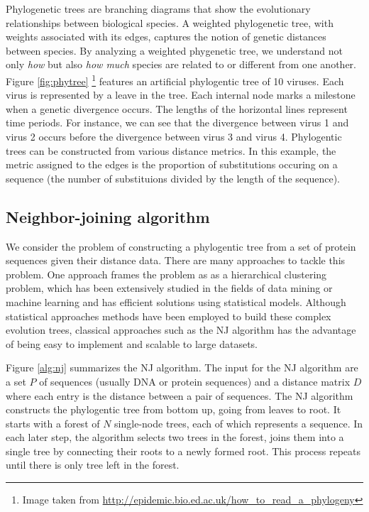 \documentclass[11pt,letterpaper]{article}
\theoremstyle{definition}
\begin{document}
Phylogenetic trees are branching diagrams that show the evolutionary relationships between biological species. A weighted phylogenetic tree, with weights associated with its edges, captures the notion of genetic distances between species. By analyzing a weighted phygenetic tree, we understand not only \textit{how} but also \textit{how much} species are related to or different from one another. Figure \ref{fig:phytree} \footnote{Image taken from \url{http://epidemic.bio.ed.ac.uk/how_to_read_a_phylogeny}} features an artificial phylogentic tree of 10 viruses. Each virus is represented by a leave in the tree. Each internal node marks a milestone when a genetic divergence occurs. The lengths of the horizontal lines represent time periods. For instance, we can see that the divergence between virus 1 and virus 2 occurs before the divergence between virus 3 and virus 4. Phylogentic trees can be constructed from various distance metrics. In this example, the metric assigned to the edges is the proportion of substitutions occuring on a sequence (the number of substituions divided by the length of the sequence). 

\subsection{Neighbor-joining algorithm}

We consider the problem of constructing a phylogentic tree from a set of protein sequences given their distance data. There are many approaches to tackle this problem. One approach frames the problem as as a hierarchical clustering problem, which has been extensively studied in the fields of data mining or machine learning and has efficient solutions using statistical models. Although statistical approaches methods have been employed to build these complex evolution trees, classical approaches such as the NJ algorithm has the advantage of being easy to implement and scalable to large datasets. 

Figure \ref{alg:nj} summarizes the NJ algorithm. The input for the NJ algorithm are a set $P$ of sequences (usually DNA or protein sequences) and a distance matrix $D$ where each entry is the distance between a pair of sequences. The NJ algorithm constructs the phylogentic tree from bottom up, going from leaves to root. It starts with a forest of $N$ single-node trees, each of which represents a sequence. In each later step, the algorithm selects two trees in the forest, joins them into a single tree by connecting their roots to a newly formed root. This process repeats until there is only tree left in the forest.
\end{document}

